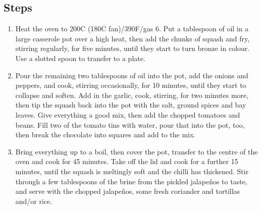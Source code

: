 \documentclass{book}
\begin{document}
\subsection*{Steps}
\begin{enumerate}
\item Heat the oven to 200C (180C fan)/390F/gas 6. Put a tablespoon of oil in a large casserole pot over a high heat, then add the chunks of squash and fry, stirring regularly, for five minutes, until they start to turn bronze in colour. Use a slotted spoon to transfer to a plate.
\item Pour the remaining two tablespoons of oil into the pot, add the onions and peppers, and cook, stirring occasionally, for 10 minutes, until they start to collapse and soften. Add in the garlic, cook, stirring, for two minutes more, then tip the squash back into the pot with the salt, ground spices and bay leaves. Give everything a good mix, then add the chopped tomatoes and beans. Fill two of the tomato tins with water, pour that into the pot, too, then break the chocolate into squares and add to the mix.
\item Bring everything up to a boil, then cover the pot, transfer to the centre of the oven and cook for 45 minutes. Take off the lid and cook for a further 15 minutes, until the squash is meltingly soft and the chilli has thickened. Stir through a few tablespoons of the brine from the pickled jalapeños to taste, and serve with the chopped jalapeños, some fresh coriander and tortillas and/or rice.
\end{enumerate}
\newpage
\end{document}
